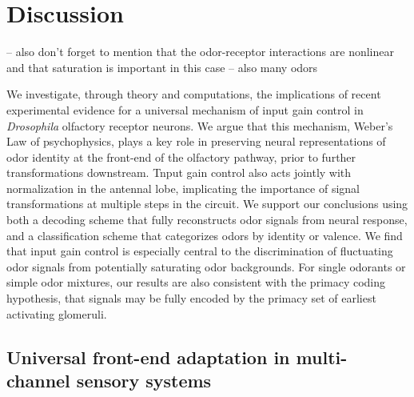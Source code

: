 \documentclass[9pt,twocolumn,twoside,lineno]{pnas-new}
\begin{document}




\section{Discussion}

{\color {blue}-- also don't forget to mention that the odor-receptor  interactions are nonlinear and that saturation is important in this case -- also many odors}


We investigate, through theory and computations, the implications of recent experimental evidence for a universal mechanism of input gain control in \textit{Drosophila} olfactory receptor neurons. We argue that this mechanism, Weber's Law of psychophysics, plays a key role in preserving neural representations of odor identity at the front-end of the olfactory pathway, prior to further transformations downstream. Tnput gain control also acts jointly with normalization in the antennal lobe, implicating the importance of signal transformations at multiple steps in the circuit. We support our conclusions using both a decoding scheme that fully reconstructs odor signals from neural response, and a classification scheme that categorizes odors by identity or valence. We find that input gain control is especially central to the discrimination of fluctuating odor signals from potentially saturating odor backgrounds. For single odorants or simple odor mixtures, our results are also consistent with the primacy coding hypothesis, that signals may be fully encoded by the primacy set of earliest activating glomeruli. %

\subsection{Universal front-end adaptation in multi-channel sensory systems}
\end{document}
